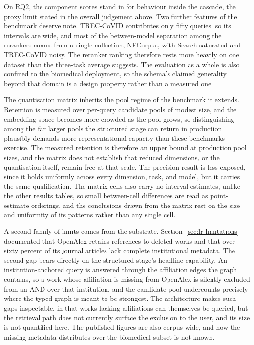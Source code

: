 On RQ2, the component scores stand in for behaviour inside the cascade, the proxy limit stated in the overall judgement above. Two further features of the benchmark deserve note. TREC-CoVID contributes only fifty queries, so its intervals are wide, and most of the between-model separation among the rerankers comes from a single collection, NFCorpus, with Search saturated and TREC-CoVID noisy. The reranker ranking therefore rests more heavily on one dataset than the three-task average suggests. The evaluation as a whole is also confined to the biomedical deployment, so the schema's claimed generality beyond that domain is a design property rather than a measured one.

The quantisation matrix inherits the pool regime of the benchmark it extends. Retention is measured over per-query candidate pools of modest size, and the embedding space becomes more crowded as the pool grows, so distinguishing among the far larger pools the structured stage can return in production plausibly demands more representational capacity than these benchmarks exercise. The measured retention is therefore an upper bound at production pool sizes, and the matrix does not establish that reduced dimensions, or the quantisation itself, remain free at that scale. The precision result is less exposed, since it holds uniformly across every dimension, task, and model, but it carries the same qualification. The matrix cells also carry no interval estimates, unlike the other results tables, so small between-cell differences are read as point-estimate orderings, and the conclusions drawn from the matrix rest on the size and uniformity of its patterns rather than any single cell.

A second family of limits comes from the substrate. Section~\ref{sec:lr-limitations} documented that OpenAlex retains references to deleted works and that over sixty percent of its journal articles lack complete institutional metadata. %
The second gap bears directly on the structured stage's headline capability. An institution-anchored query is answered through the affiliation edges the graph contains, so a work whose affiliation is missing from OpenAlex is silently excluded from an AND over that institution, and the candidate pool undercounts precisely where the typed graph is meant to be strongest. The architecture makes such gaps inspectable, in that works lacking affiliations can themselves be queried, but the retrieval path does not currently surface the exclusion to the user, and its size is not quantified here. The published figures are also corpus-wide, and how the missing metadata distributes over the biomedical subset is not known.

